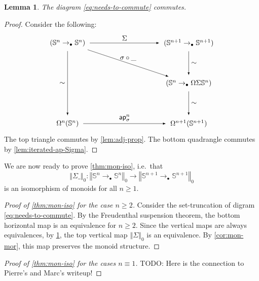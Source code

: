 \documentclass[11pt,a4paper,oneside,reqno]{amsart}
\newtheorem{lemma}[theorem]{Lemma}
\theoremstyle{definition}
\theoremstyle{remark}
\newcommand{\sph}[1]{{\mathbb S}^{#1}}
\newcommand{\trunc}[2]{\mathopen{}\left\Vert #2\right\Vert_{#1}\mathclose{}}
\newcommand{\pointedm}{\rightarrow_\bullet}
\begin{document}
\begin{lemma} \label{lem:what-commutes-commutes}
 The diagram \eqref{eq:needs-to-commute} commutes.
\end{lemma}
\begin{proof}
 Consider the following:
\begin{equation}
\begin{tikzpicture}[x=6cm,y=-2cm,baseline=(current bounding box.center)]
 \tikzset{arrow/.style={shorten >=0.1cm,shorten <=.1cm,-latex}}
 \node (A) at (0,0) {$(\sph n \pointedm \sph n)$}; 
 \node (B) at (0,2) {$\Omega^n(\sph n)$}; 
 \node (C) at (1,2) {$\Omega^{n+1}(\sph {n+1})$}; 
 \node (D) at (1,0) {$(\sph {n+1} \pointedm \sph {n+1})$}; 
 \node (E) at (1,1) {$(\sph n \pointedm \Omega \Sigma \sph n)$};
 
 \draw[arrow] (A) to node [left] {$\sim$} (B);
 \draw[arrow] (B) to node [above] {$\mathsf{ap}^n_\sigma$} (C);
 \draw[arrow] (A) to node [above] {$\Sigma$} (D);
 \draw[arrow] (D) to node [right] {$\sim$} (E);
 \draw[arrow] (E) to node [right] {$\sim$} (C);
 \draw[arrow] (A) to node [above] {$\sigma \circ \_$} (E);
\end{tikzpicture}
\end{equation}
The top triangle commutes by \cref{lem:adj-prop}.
The bottom quadrangle commutes by \cref{lem:iterated-ap-Sigma}.
\end{proof}

We are now ready to prove
\cref{thm:mon-iso}, i.e.\ that 
\begin{equation}
 \trunc 0 {\Sigma \_} : \trunc 0 {\sph n \pointedm \sph n} \to \trunc 0 {\sph {n+1} \pointedm \sph {n+1}}
\end{equation}
is an isomorphism of monoids for all $n \geq 1$. 

\begin{proof}[Proof of \cref{thm:mon-iso} for the case $n \geq 2$]
 Consider the set-truncation of digram \eqref{eq:needs-to-commute}.
 By the Freudenthal suspension theorem, the bottom horizontal map is an equivalence for $n \geq 2$.
 Since the vertical maps are always equivalences, by \cref{lem:what-commutes-commutes}, the top vertical map $\trunc 0 \Sigma$ is an equivalence.
 By \cref{cor:mon-mor}, this map preserves the monoid structure.
\end{proof}

\begin{proof}[Proof of \cref{thm:mon-iso} for the cases $n \equiv 1$]
 TODO: Here is the connection to Pierre's and Marc's writeup!
\end{proof}
\end{document}
